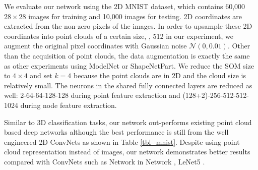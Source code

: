 \documentclass[10pt,twocolumn,letterpaper]{article}
\begin{document}
We evaluate our network using the 2D MNIST dataset, which contains 60,000 $28\times 28$ images for training and 10,000 images for testing. 2D coordinates are extracted from the non-zero pixels of the images. In order to upsample these 2D coordinates into point clouds of a certain size, \eg, 512 in our experiment, we augment the original pixel coordinates with Gaussian noise $\mathcal{N}(0, 0.01)$. Other than the acquisition of point clouds, the data augmentation is exactly the same as other experiments using ModelNet or ShapeNetPart. We reduce the SOM size to $4\times 4$ and set $k=4$ because the point clouds are in 2D and the cloud size is relatively small. The neurons in the shared fully connected layers are reduced as well: 2-64-64-128-128 during point feature extraction and (128+2)-256-512-512-1024 during node feature extraction.

Similar to 3D classification tasks, our network out-performs existing point cloud based deep networks although the best performance is still from the well engineered 2D ConvNets as shown in Table \ref{tbl_mnist}. Despite using point cloud representation instead of images, our network demonstrates better results compared with ConvNets such as Network in Network \cite{lin2013network}, LeNet5 \cite{lecun1998gradient}.
\end{document}
